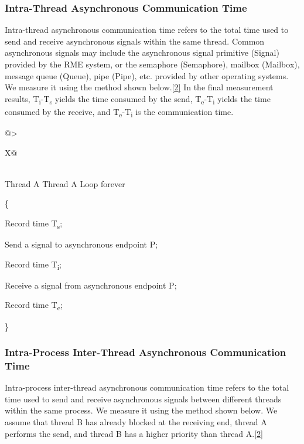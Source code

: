 \subsubsection{Intra-Thread Asynchronous Communication Time}\label{subsubsec:1-intra-thread-async-communication}

Intra-thread asynchronous communication time refers to the total time used to send and receive asynchronous signals within the same thread. Common asynchronous signals may include the asynchronous signal primitive (Signal) provided by the RME system, or the semaphore (Semaphore), mailbox (Mailbox), message queue (Queue), pipe (Pipe), etc. provided by other operating systems. We measure it using the method shown below.\hyperref[cite:1-2]{{[}2{]}}
In the final measurement results, T\textsubscript{i}-T\textsubscript{s} yields the time consumed by the send, T\textsubscript{e}-T\textsubscript{i} yields the time consumed by the receive, and T\textsubscript{e}-T\textsubscript{i} is the communication time.

\begin{xltabular}{\textwidth}{@{}>{\hsize\raggedright\arraybackslash}X@{}}
\caption{Intra-Thread Asynchronous Communication}\label{tab:1-8-intra-thread-async-communication}\\
\toprule
Thread A\tabularnewline
\endfirsthead
\toprule
Thread A\tabularnewline
\midrule
\endhead
\bottomrule
\endlastfoot
Loop forever

\{

Record time T\textsubscript{s};

Send a signal to asynchronous endpoint P;

Record time T\textsubscript{i};

Receive a signal from asynchronous endpoint P;

Record time T\textsubscript{e};

\}\strut
\tabularnewline
\end{xltabular}
\nopagebreak[4]

\subsubsection{Intra-Process Inter-Thread Asynchronous Communication Time}\label{subsubsec:1-intra-process-async-communication}

Intra-process inter-thread asynchronous communication time refers to the total time used to send and receive asynchronous signals between different threads within the same process. We measure it using the method shown below. We assume that thread B has already blocked at the receiving end, thread A performs the send, and thread B has a higher priority than thread A.\hyperref[cite:1-2]{{[}2{]}}

